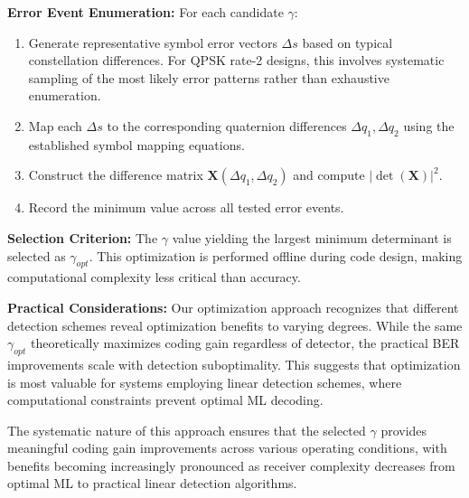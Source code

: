 \textbf{Error Event Enumeration:} For each candidate $\gamma$:
\begin{enumerate}
    \item Generate representative symbol error vectors $\Delta s$ based on typical constellation differences. 
    For QPSK rate-2 designs, this involves systematic sampling of the most likely error patterns rather than exhaustive enumeration.
    
    \item Map each $\Delta s$ to the corresponding quaternion differences $\Delta q_1, \Delta q_2$ using the established symbol mapping equations.
    
    \item Construct the difference matrix $\mathbf{X}(\Delta q_1, \Delta q_2)$ and compute $|\det(\mathbf{X})|^2$.
    
    \item Record the minimum value across all tested error events.
\end{enumerate}

\textbf{Selection Criterion:} The $\gamma$ value yielding the largest minimum determinant is selected as $\gamma_{opt}$. 
This optimization is performed offline during code design, making computational complexity less critical than accuracy.

\textbf{Practical Considerations:} Our optimization approach recognizes that different detection schemes reveal optimization benefits to varying degrees. 
While the same $\gamma_{opt}$ theoretically maximizes coding gain regardless of detector, the practical BER improvements scale with detection suboptimality. 
This suggests that optimization is most valuable for systems employing linear detection schemes, where computational constraints prevent optimal ML decoding.

The systematic nature of this approach ensures that the selected $\gamma$ provides meaningful coding gain improvements across various operating conditions, with benefits becoming increasingly pronounced as receiver complexity decreases from optimal ML to practical linear detection algorithms.
